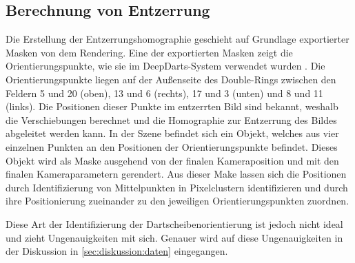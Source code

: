 \subsection{Berechnung von Entzerrung}  %
\label{sec:berechnung_entzerrung}

Die Erstellung der Entzerrungshomographie geschieht auf Grundlage exportierter Masken von dem Rendering. Eine der exportierten Masken zeigt die Orientierungspunkte, wie sie im DeepDarts-System verwendet wurden \cite{deepdarts}. Die Orientierungspunkte liegen auf der Außenseite des Double-Rings zwischen den Feldern 5 und 20 (oben), 13 und 6 (rechts), 17 und 3 (unten) und 8 und 11 (links). Die Positionen dieser Punkte im entzerrten Bild sind bekannt, weshalb die Verschiebungen berechnet und die Homographie zur Entzerrung des Bildes abgeleitet werden kann. In der Szene befindet sich ein Objekt, welches aus vier einzelnen Punkten an den Positionen der Orientierungspunkte befindet. Dieses Objekt wird als Maske ausgehend von der finalen Kameraposition und mit den finalen Kameraparametern gerendert. Aus dieser Make lassen sich die Positionen durch Identifizierung von Mittelpunkten in Pixelclustern identifizieren und durch ihre Positionierung zueinander zu den jeweiligen Orientierungspunkten zuordnen.

Diese Art der Identifizierung der Dartscheibenorientierung ist jedoch nicht ideal und zieht Ungenauigkeiten mit sich. Genauer wird auf diese Ungenauigkeiten in der Diskussion in \autoref{sec:diskussion:daten} eingegangen.
